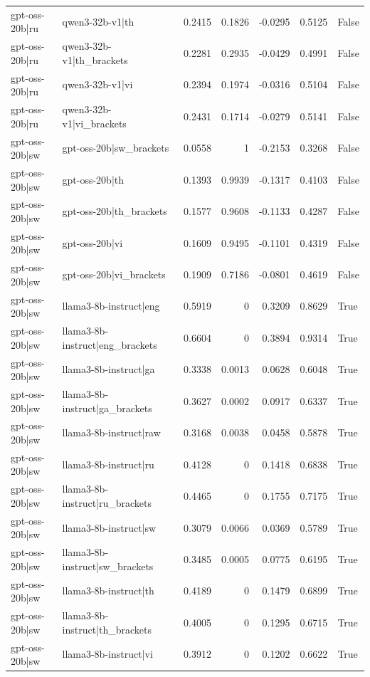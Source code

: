 \begin{table}
\begin{tabular}{l l r r r r l}
gpt-oss-20b|ru & qwen3-32b-v1|th & 0.2415 & 0.1826 & -0.0295 & 0.5125 & False \\
gpt-oss-20b|ru & qwen3-32b-v1|th_brackets & 0.2281 & 0.2935 & -0.0429 & 0.4991 & False \\
gpt-oss-20b|ru & qwen3-32b-v1|vi & 0.2394 & 0.1974 & -0.0316 & 0.5104 & False \\
gpt-oss-20b|ru & qwen3-32b-v1|vi_brackets & 0.2431 & 0.1714 & -0.0279 & 0.5141 & False \\
gpt-oss-20b|sw & gpt-oss-20b|sw_brackets & 0.0558 & 1 & -0.2153 & 0.3268 & False \\
gpt-oss-20b|sw & gpt-oss-20b|th & 0.1393 & 0.9939 & -0.1317 & 0.4103 & False \\
gpt-oss-20b|sw & gpt-oss-20b|th_brackets & 0.1577 & 0.9608 & -0.1133 & 0.4287 & False \\
gpt-oss-20b|sw & gpt-oss-20b|vi & 0.1609 & 0.9495 & -0.1101 & 0.4319 & False \\
gpt-oss-20b|sw & gpt-oss-20b|vi_brackets & 0.1909 & 0.7186 & -0.0801 & 0.4619 & False \\
gpt-oss-20b|sw & llama3-8b-instruct|eng & 0.5919 & 0 & 0.3209 & 0.8629 & True \\
gpt-oss-20b|sw & llama3-8b-instruct|eng_brackets & 0.6604 & 0 & 0.3894 & 0.9314 & True \\
gpt-oss-20b|sw & llama3-8b-instruct|ga & 0.3338 & 0.0013 & 0.0628 & 0.6048 & True \\
gpt-oss-20b|sw & llama3-8b-instruct|ga_brackets & 0.3627 & 0.0002 & 0.0917 & 0.6337 & True \\
gpt-oss-20b|sw & llama3-8b-instruct|raw & 0.3168 & 0.0038 & 0.0458 & 0.5878 & True \\
gpt-oss-20b|sw & llama3-8b-instruct|ru & 0.4128 & 0 & 0.1418 & 0.6838 & True \\
gpt-oss-20b|sw & llama3-8b-instruct|ru_brackets & 0.4465 & 0 & 0.1755 & 0.7175 & True \\
gpt-oss-20b|sw & llama3-8b-instruct|sw & 0.3079 & 0.0066 & 0.0369 & 0.5789 & True \\
gpt-oss-20b|sw & llama3-8b-instruct|sw_brackets & 0.3485 & 0.0005 & 0.0775 & 0.6195 & True \\
gpt-oss-20b|sw & llama3-8b-instruct|th & 0.4189 & 0 & 0.1479 & 0.6899 & True \\
gpt-oss-20b|sw & llama3-8b-instruct|th_brackets & 0.4005 & 0 & 0.1295 & 0.6715 & True \\
gpt-oss-20b|sw & llama3-8b-instruct|vi & 0.3912 & 0 & 0.1202 & 0.6622 & True \\

\end{tabular}
\end{table}
